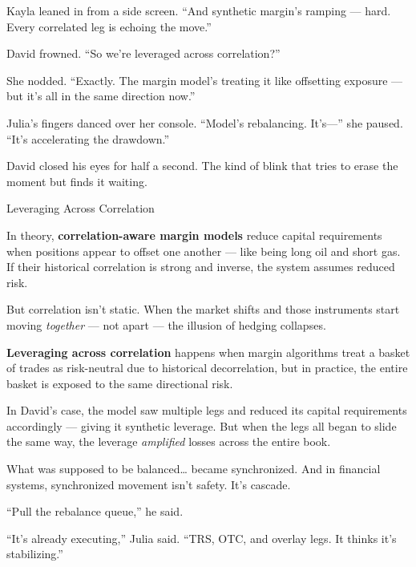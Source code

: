 Kayla leaned in from a side screen. “And synthetic margin’s ramping — hard. Every correlated leg is echoing the move.”

David frowned. “So we’re leveraged across correlation?”

She nodded. “Exactly. The margin model’s treating it like offsetting exposure — but it’s all in the same direction now.”

Julia’s fingers danced over her console. “Model’s rebalancing. It’s—” she paused. “It’s accelerating the drawdown.”

David closed his eyes for half a second. The kind of blink that tries to erase the moment but finds it waiting.

\begin{TechnicalSidebar}{Leveraging Across Correlation}

  In theory, \textbf{correlation-aware margin models} reduce capital requirements when positions appear to offset one 
  another — like being long oil and short gas. If their historical correlation is strong and inverse, the system assumes 
  reduced risk.

  \medskip

  But correlation isn’t static.  
  When the market shifts and those instruments start moving \textit{together} — not apart — the illusion of hedging collapses.

  \medskip

  \textbf{Leveraging across correlation} happens when margin algorithms treat a basket of trades as risk-neutral due to 
  historical decorrelation, but in practice, the entire basket is exposed to the same directional risk.

  \medskip

  In David’s case, the model saw multiple legs and reduced its capital requirements accordingly — giving it synthetic 
  leverage. But when the legs all began to slide the same way, the leverage \textit{amplified} losses across the entire book.

  \medskip

  What was supposed to be balanced… became synchronized.  
  And in financial systems, synchronized movement isn’t safety.  
  It’s cascade.

\end{TechnicalSidebar}

“Pull the rebalance queue,” he said.

“It’s already executing,” Julia said. “TRS, OTC, and overlay legs. It thinks it's stabilizing.”


